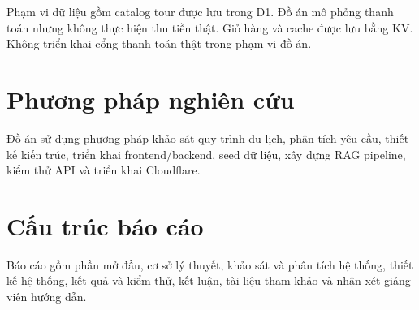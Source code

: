 Phạm vi dữ liệu gồm catalog tour được lưu trong D1. Đồ án mô phỏng thanh toán nhưng không thực hiện thu tiền thật. Giỏ hàng và cache được lưu bằng KV. Không triển khai cổng thanh toán thật trong phạm vi đồ án.

\section*{Phương pháp nghiên cứu}
Đồ án sử dụng phương pháp khảo sát quy trình du lịch, phân tích yêu cầu, thiết kế kiến trúc, triển khai frontend/backend, seed dữ liệu, xây dựng RAG pipeline, kiểm thử API và triển khai Cloudflare.

\section*{Cấu trúc báo cáo}
Báo cáo gồm phần mở đầu, cơ sở lý thuyết, khảo sát và phân tích hệ thống, thiết kế hệ thống, kết quả và kiểm thử, kết luận, tài liệu tham khảo và nhận xét giảng viên hướng dẫn.
